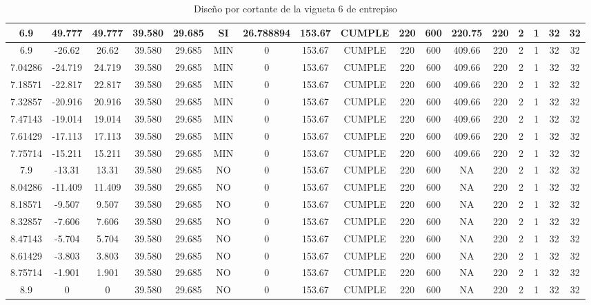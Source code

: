 \begin{table}[H]
{\begin{tabular}{|c|c|c|c|c|c|c|c|c|c|c|c|c|c|c|c|c|}
    \hline
    6.9 & 49.777 & 49.777 & 39.580 & 29.685 & SI  & 26.788894 & 153.67 & CUMPLE & 220 & 600 & 220.75 & 220 & 2   & 1   & 32  & 32 \bigstrut\\
    \hline
    6.9 & -26.62 & 26.62 & 39.580 & 29.685 & MIN & 0   & 153.67 & CUMPLE & 220 & 600 & 409.66 & 220 & 2   & 1   & 32  & 32 \bigstrut\\
    \hline
    7.04286 & -24.719 & 24.719 & 39.580 & 29.685 & MIN & 0   & 153.67 & CUMPLE & 220 & 600 & 409.66 & 220 & 2   & 1   & 32  & 32 \bigstrut\\
    \hline
    7.18571 & -22.817 & 22.817 & 39.580 & 29.685 & MIN & 0   & 153.67 & CUMPLE & 220 & 600 & 409.66 & 220 & 2   & 1   & 32  & 32 \bigstrut\\
    \hline
    7.32857 & -20.916 & 20.916 & 39.580 & 29.685 & MIN & 0   & 153.67 & CUMPLE & 220 & 600 & 409.66 & 220 & 2   & 1   & 32  & 32 \bigstrut\\
    \hline
    7.47143 & -19.014 & 19.014 & 39.580 & 29.685 & MIN & 0   & 153.67 & CUMPLE & 220 & 600 & 409.66 & 220 & 2   & 1   & 32  & 32 \bigstrut\\
    \hline
    7.61429 & -17.113 & 17.113 & 39.580 & 29.685 & MIN & 0   & 153.67 & CUMPLE & 220 & 600 & 409.66 & 220 & 2   & 1   & 32  & 32 \bigstrut\\
    \hline
    7.75714 & -15.211 & 15.211 & 39.580 & 29.685 & MIN & 0   & 153.67 & CUMPLE & 220 & 600 & 409.66 & 220 & 2   & 1   & 32  & 32 \bigstrut\\
    \hline
    7.9 & -13.31 & 13.31 & 39.580 & 29.685 & NO  & 0   & 153.67 & CUMPLE & 220 & 600 & NA  & 220 & 2   & 1   & 32  & 32 \bigstrut\\
    \hline
    8.04286 & -11.409 & 11.409 & 39.580 & 29.685 & NO  & 0   & 153.67 & CUMPLE & 220 & 600 & NA  & 220 & 2   & 1   & 32  & 32 \bigstrut\\
    \hline
    8.18571 & -9.507 & 9.507 & 39.580 & 29.685 & NO  & 0   & 153.67 & CUMPLE & 220 & 600 & NA  & 220 & 2   & 1   & 32  & 32 \bigstrut\\
    \hline
    8.32857 & -7.606 & 7.606 & 39.580 & 29.685 & NO  & 0   & 153.67 & CUMPLE & 220 & 600 & NA  & 220 & 2   & 1   & 32  & 32 \bigstrut\\
    \hline
    8.47143 & -5.704 & 5.704 & 39.580 & 29.685 & NO  & 0   & 153.67 & CUMPLE & 220 & 600 & NA  & 220 & 2   & 1   & 32  & 32 \bigstrut\\
    \hline
    8.61429 & -3.803 & 3.803 & 39.580 & 29.685 & NO  & 0   & 153.67 & CUMPLE & 220 & 600 & NA  & 220 & 2   & 1   & 32  & 32 \bigstrut\\
    \hline
    8.75714 & -1.901 & 1.901 & 39.580 & 29.685 & NO  & 0   & 153.67 & CUMPLE & 220 & 600 & NA  & 220 & 2   & 1   & 32  & 32 \bigstrut\\
    \hline
    8.9 & 0   & 0   & 39.580 & 29.685 & NO  & 0   & 153.67 & CUMPLE & 220 & 600 & NA  & 220 & 2   & 1   & 32  & 32 \bigstrut\\
    \hline
    
    \end{tabular}}%
    \caption{Diseño por cortante de la vigueta 6 de entrepiso}
  \label{tab:CORT VT6 EP}%
\end{table}%
